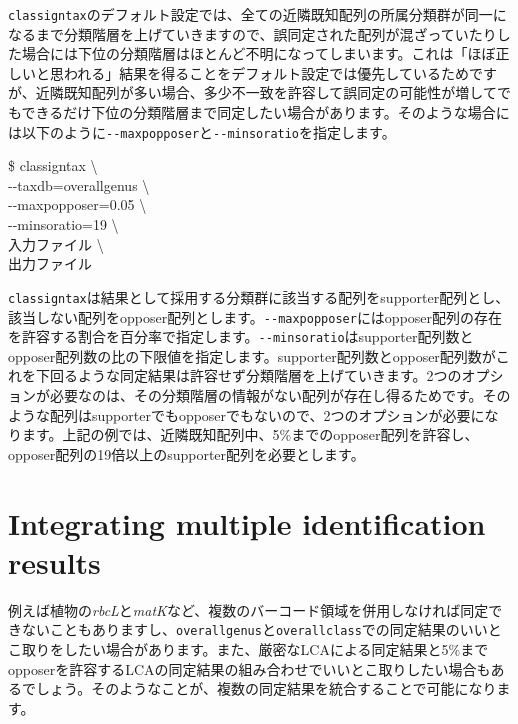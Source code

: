 \documentclass[titlepage,10pt,a4paper,english]{jsbook}
\newenvironment{cmd}{\begin{oframed}\raggedright\ttfamily\footnotesize\setlength{\baselineskip}{1.4em}}{\end{oframed}\vspace{-1em}}
\begin{document}
\texttt{classigntax}のデフォルト設定では、全ての近隣既知配列の所属分類群が同一になるまで分類階層を上げていきますので、誤同定された配列が混ざっていたりした場合には下位の分類階層はほとんど不明になってしまいます。これは「ほぼ正しいと思われる」結果を得ることをデフォルト設定では優先しているためですが、近隣既知配列が多い場合、多少不一致を許容して誤同定の可能性が増してでもできるだけ下位の分類階層まで同定したい場合があります。そのような場合には以下のように\texttt{{-}{-}maxpopposer}と\texttt{{-}{-}minsoratio}を指定します。
\begin{cmd}
\$ classigntax {\textbackslash}\\
{-}{-}taxdb=overall{\textunderscore}genus {\textbackslash}\\
{-}{-}maxpopposer=0.05 {\textbackslash}\\
{-}{-}minsoratio=19 {\textbackslash}\\
入力ファイル {\textbackslash}\\
出力ファイル
\end{cmd}
\texttt{classigntax}は結果として採用する分類群に該当する配列をsupporter配列とし、該当しない配列をopposer配列とします。\texttt{{-}{-}maxpopposer}にはopposer配列の存在を許容する割合を百分率で指定します。\texttt{{-}{-}minsoratio}はsupporter配列数とopposer配列数の比の下限値を指定します。supporter配列数とopposer配列数がこれを下回るような同定結果は許容せず分類階層を上げていきます。2つのオプションが必要なのは、その分類階層の情報がない配列が存在し得るためです。そのような配列はsupporterでもopposerでもないので、2つのオプションが必要になります。上記の例では、近隣既知配列中、5\%までのopposer配列を許容し、opposer配列の19倍以上のsupporter配列を必要とします。

\section{Integrating multiple identification results}
例えば植物の\textit{rbcL}と\textit{matK}など、複数のバーコード領域を併用しなければ同定できないこともありますし、\texttt{overall{\textunderscore}genus}と\texttt{overall{\textunderscore}class}での同定結果のいいとこ取りをしたい場合があります。また、厳密なLCAによる同定結果と5\%までopposerを許容するLCAの同定結果の組み合わせでいいとこ取りしたい場合もあるでしょう。そのようなことが、複数の同定結果を統合することで可能になります。
\end{document}
